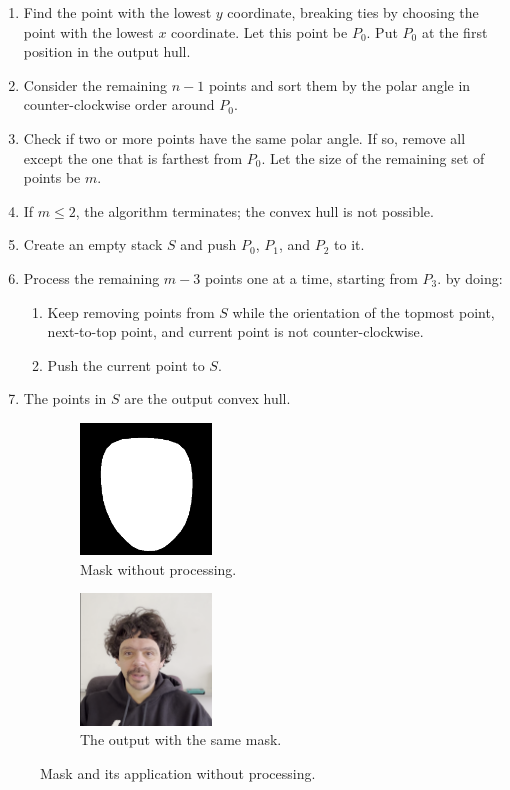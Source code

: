 \documentclass[preprint]{elsarticle}
\begin{document}
\begin{enumerate}
	\item Find the point with the lowest $y$ coordinate, breaking ties by choosing the point with the lowest $x$ coordinate. 
	Let this point be $P_0$. Put $P_0$ at the first position in the output hull.
	\item Consider the remaining $n-1$ points and sort them by the polar angle in counter-clockwise order around $P_0$.
	\item Check if two or more points have the same polar angle. If so, remove all except the one that is farthest from $P_0$. 
	Let the size of the remaining set of points be $m$.
	\item If $m \leq 2$, the algorithm terminates; the convex hull is not possible.
	\item Create an empty stack $S$ and push $P_0$, $P_1$, and $P_2$ to it.
	\item Process the remaining $m-3$ points one at a time, starting from $P_3$. by doing:
	\begin{enumerate}
		\item Keep removing points from $S$ while the orientation of the topmost point, next-to-top point, and current point is not counter-clockwise.
		\item Push the current point to $S$.
	\end{enumerate}
	\item The points in $S$ are the output convex hull.
\end{enumerate}

\begin{figure}[t]
	\centering
	\begin{subfigure}[b]{0.5\textwidth}
		\centering
		\includegraphics[width=3.5cm, keepaspectratio]{img/project_img/mask.png}
		\caption{Mask without processing.}\label{fig:mask-noblur}
	\end{subfigure}%
	\hfill
	\begin{subfigure}[b]{0.5\textwidth}
		\centering
		\includegraphics[width=3.5cm, keepaspectratio]{img/project_img/final-erorr.png}
		\caption{The output with the same mask.}\label{fig:mask-final-error}
	\end{subfigure}
	\caption{Mask and its application without processing.}\label{fig:eroor-mediapipe}
\end{figure}
\end{document}
